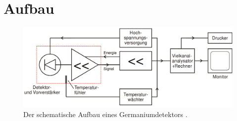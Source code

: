 \section{Aufbau}
\label{sec:Aufbau}

\begin{figure}
	\centering
	\includegraphics[width=\linewidth-100pt,height=\textheight-100pt,keepaspectratio]{content/Images/detektor.png}
    \caption{Der schematische Aufbau eines Germaniumdetektors  \cite{V18}.}
    \label{fif:spektrum}
\end{figure}

